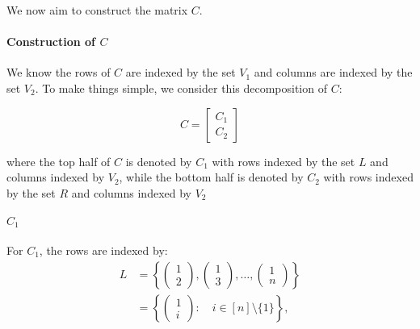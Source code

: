 We now aim to construct the matrix $C$.
\paragraph{Construction of \texorpdfstring{$C$}{C}}
We know the rows of \(C\) are indexed by the set \(V_1\) and columns are indexed by the set \(V_2\). To make things simple, we consider this decomposition of $C$:

\begin{equation*}
    C = \begin{bmatrix}
        C_1\\C_2
    \end{bmatrix}
\end{equation*}

where the top half of \(C\) is denoted by \(C_1\) with rows indexed by the set \(L\) and columns indexed by \(V_2\), while the bottom half is denoted by \(C_2\) with rows indexed by the set \(R\) and columns indexed by \(V_2\)

\paragraph{\texorpdfstring{$C_1$}{C1}}

For \( C_1 \), the rows are indexed by:
\begin{align*}
    L &= \left\{\begin{pmatrix} 1 \\ 2 \end{pmatrix}, \begin{pmatrix} 1 \\ 3 \end{pmatrix}, \dots, \begin{pmatrix} 1 \\ n \end{pmatrix}\right\} \\
    &= \left\{ \begin{pmatrix}1 \\ i\end{pmatrix}:\quad i\in[n]\setminus\{1\}\right\},
\end{align*}

